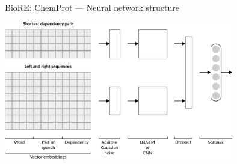 \begin{frame}[t]{BioRE: ChemProt --- Neural network structure}

\centering


\includegraphics[width=0.75\textwidth]{img/chemprot-nn/v3/001.pdf}%

\end{frame}
